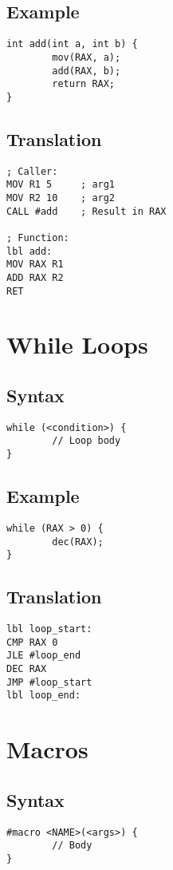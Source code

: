 \documentclass[a4paper,11pt]{book}
\begin{document}
\subsection*{Example}
\begin{lstlisting}[language=Wake]
int add(int a, int b) {
		mov(RAX, a);
		add(RAX, b);
		return RAX;
}
\end{lstlisting}

\subsection*{Translation}
\begin{lstlisting}[language=MicroASM]
; Caller:
MOV R1 5     ; arg1
MOV R2 10    ; arg2
CALL #add    ; Result in RAX

; Function:
lbl add:
MOV RAX R1
ADD RAX R2
RET
\end{lstlisting}

\section{While Loops}
\subsection*{Syntax}
\begin{lstlisting}[language=Wake]
while (<condition>) {
		// Loop body
}
\end{lstlisting}

\subsection*{Example}
\begin{lstlisting}[language=Wake]
while (RAX > 0) {
		dec(RAX);
}
\end{lstlisting}

\subsection*{Translation}
\begin{lstlisting}[language=MicroASM]
lbl loop_start:
CMP RAX 0
JLE #loop_end
DEC RAX
JMP #loop_start
lbl loop_end:
\end{lstlisting}

\section{Macros}
\subsection*{Syntax}
\begin{lstlisting}[language=Wake]
#macro <NAME>(<args>) {
		// Body
}
\end{lstlisting}
\end{document}
